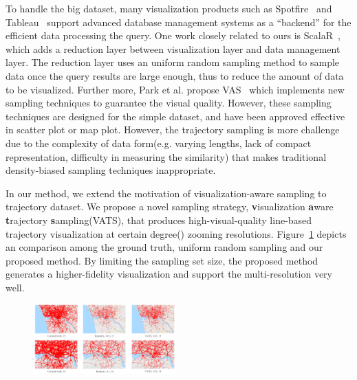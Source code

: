 To handle the big dataset, many visualization products such as Spotfire~\cite{} and Tableau~\cite{} support advanced database management systems as a ``backend'' for the efficient data processing the query.
One work closely related to ours is ScalaR~\cite{battle2013dynamic}, which adds a reduction layer between visualization layer and data management layer. The reduction layer uses an uniform random sampling method to sample data once the query results are large enough, thus to reduce the amount of data to be visualized.
Further more, Park et al. propose VAS~\cite{park2016visualization} which implements new sampling techniques to guarantee the visual quality. However, these sampling techniques are designed for the simple dataset, and have been approved effective in scatter plot or map plot. However, the trajectory sampling is more challenge due to the complexity of data form(e.g. varying lengths, lack of compact representation, difficulty in measuring the similarity) that makes traditional density-biased sampling techniques inappropriate.

In our method, we extend the motivation of visualization-aware sampling to trajectory dataset. We propose a novel sampling strategy, \textbf{v}isualization \textbf{a}ware \textbf{t}rajectory \textbf{s}ampling(VATS), that produces high-visual-quality line-based trajectory visualization at certain degree() zooming resolutions. 
Figure~\ref{fig:compare} depicts an comparison among the ground truth,  uniform random sampling and our proposed method. By limiting the sampling set size, the proposed method generates a higher-fidelity visualization and support the multi-resolution very well.   

\begin{figure}[t]
	\centering
	\includegraphics[width=0.49\textwidth]{pictures/introduction/compare.pdf}
	\vspace{-5mm}
	\caption{ }
	\vspace{-5mm}
	\label{fig:compare}
\end{figure}

